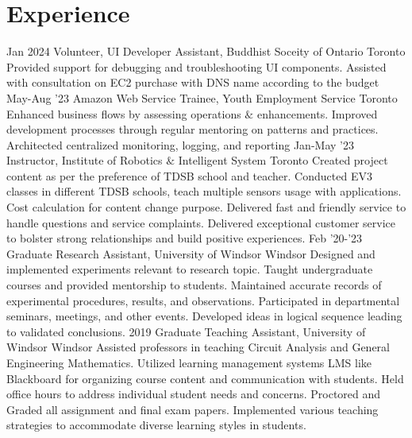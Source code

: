 \documentclass[]{twentysecondcv}
\begin{document}
\section{Experience}
\begin{twenty}
  \twentyitem
    {Jan 2024}
    {Volunteer, UI Developer Assistant, Buddhist Soceity of Ontario}
    {Toronto}
    { Provided support for debugging and troubleshooting UI components. 
      Assisted with consultation on EC2 purchase with DNS name according to the budget }
  \twentyitem
    {May-Aug '23}
    {Amazon Web Service Trainee, Youth Employment Service}
    {Toronto}
    {Enhanced business flows by assessing operations $\&$ enhancements. 
    Improved development processes through regular mentoring on patterns and practices. 
    Architected centralized monitoring, logging, and reporting}
  \twentyitem
    {Jan-May '23}
    {Instructor, Institute of Robotics $\&$ Intelligent System}
    {Toronto}
    {Created project content as per the preference of TDSB school and teacher.
    Conducted EV3 classes in different TDSB schools, teach multiple sensors usage with applications.
    Cost calculation for content change purpose.
    Delivered fast and friendly service to handle questions and service complaints.
    Delivered exceptional customer service to bolster strong relationships and build positive experiences.}
    \twentyitem
    {Feb '20-'23} 
    {Graduate Research Assistant, University of Windsor}
    {Windsor}
    {Designed and implemented experiments relevant to research topic.
    Taught undergraduate courses and provided mentorship to students.
    Maintained accurate records of experimental procedures, results, and observations.
    Participated in departmental seminars, meetings, and other events.
    Developed ideas in logical sequence leading to validated conclusions.}
    \twentyitem
    {2019}
    {Graduate Teaching Assistant,  University of Windsor}
    {Windsor}
    {Assisted professors in teaching Circuit Analysis and General Engineering Mathematics.
    Utilized learning management systems LMS like Blackboard for organizing course content and communication with students.
    Held office hours to address individual student needs and concerns. Proctored and Graded all assignment and final exam papers.
    Implemented various teaching strategies to accommodate diverse learning styles in students.}

  \end{twenty}
\end{document}
